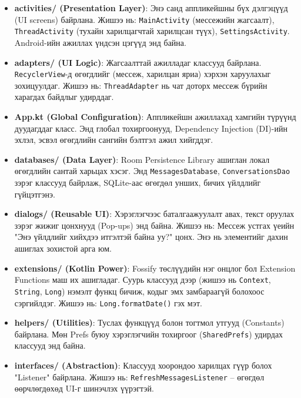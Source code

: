 \begin{itemize}
    \item \textbf{activities/ (Presentation Layer)}: Энэ санд аппликейшны бүх дэлгэцүүд (UI screens) байрлана. Жишээ нь: \texttt{MainActivity} (мессежийн жагсаалт), \texttt{ThreadActivity} (тухайн харилцагчтай харилцсан түүх), \texttt{SettingsActivity}. Android-ийн ажиллах үндсэн цэгүүд энд байна.

    \item \textbf{adapters/ (UI Logic)}: Жагсаалттай ажилладаг классууд байрлана. \texttt{RecyclerView}-д өгөгдлийг (мессеж, харилцан яриа) хэрхэн харуулахыг зохицуулдаг. Жишээ нь: \texttt{ThreadAdapter} нь чат доторх мессеж бүрийн харагдах байдлыг удирддаг.

    \item \textbf{App.kt (Global Configuration)}: Аппликейшн ажиллахад хамгийн түрүүнд дуудагддаг класс. Энд глобал тохиргоонууд, Dependency Injection (DI)-ийн эхлэл, эсвэл өгөгдлийн сангийн бэлтгэл ажил хийгддэг.

    \item \textbf{databases/ (Data Layer)}: Room Persistence Library ашиглан локал өгөгдлийн сантай харьцах хэсэг. Энд \texttt{MessagesDatabase}, \texttt{ConversationsDao} зэрэг классууд байрлаж, SQLite-аас өгөгдөл унших, бичих үйлдлийг гүйцэтгэнэ.

    \item \textbf{dialogs/ (Reusable UI)}: Хэрэглэгчээс баталгаажуулалт авах, текст оруулах зэрэг жижиг цонхнууд (Pop-ups) энд байна. Жишээ нь: Мессеж устгах үеийн "Энэ үйлдлийг хийхдээ итгэлтэй байна уу?" цонх. Энэ нь элементийг дахин ашиглах \cite{design_patterns} зохистой арга юм.

    \item \textbf{extensions/ (Kotlin Power)}: Fossify төслүүдийн нэг онцлог бол Extension Functions маш их ашигладаг. Суурь классууд дээр (жишээ нь \texttt{Context}, \texttt{String}, \texttt{Long}) нэмэлт функц бичиж, кодыг эмх замбараагүй болохоос сэргийлдэг. Жишээ нь: \texttt{Long.formatDate()} гэх мэт.

    \item \textbf{helpers/ (Utilities)}: Туслах функцүүд болон тогтмол утгууд (Constants) байрлана. Мөн Prefs буюу хэрэглэгчийн тохиргоог (\texttt{SharedPrefs}) удирдах классууд энд байна.

    \item \textbf{interfaces/ (Abstraction)}: Классууд хоорондоо харилцах гүүр болох "Listener" байрлана. Жишээ нь: \texttt{RefreshMessagesListener} – өгөгдөл өөрчлөгдөхөд UI-г шинэчлэх үүрэгтэй.


\end{itemize}
